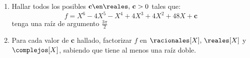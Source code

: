   \def\c{\textbf{c}}

\begin{enunciado}{\ejExtra}
  \begin{enumerate}[label=\alph*)]
    \item Hallar todos los posibles $\c \en \reales,\, \c > 0$ tales que:
          $$ f = X^6 - 4X^5 - X^4 + 4X^3 + 4X^2 + 48X + \c$$ tenga una raíz de argumento $\frac{3\pi}{2}$

    \item Para cada valor de $\c$ hallado, factorizar $f$ en $\racionales[X],\, \reales[X]$ y $\complejos[X]$, sabiendo que tiene al menos una raíz doble.
  \end{enumerate}

\end{enunciado}

